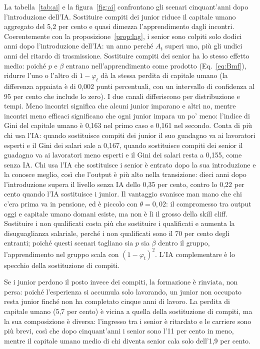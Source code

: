 \documentclass[preprint,12pt,authoryear]{elsarticle}
\begin{document}
La tabella~\ref{tab:ai} e la figura~\ref{fig:ai} confrontano gli scenari cinquant'anni dopo l'introduzione dell'IA. Sostituire compiti dei junior riduce il capitale umano aggregato del 5,2 per cento e quasi dimezza l'apprendimento dagli incontri. Coerentemente con la proposizione~\ref{prop:lag}, i senior sono colpiti solo dodici anni dopo l'introduzione dell'IA: un anno perché $A_t$ superi uno, più gli undici anni del ritardo di trasmissione. Sostituire compiti dei senior ha lo stesso effetto medio: poiché $p$ e $\beta$ entrano nell'apprendimento come prodotto (Eq.~\eqref{eq:Bmf}), ridurre l'uno o l'altro di $1-\varphi_t$ dà la stessa perdita di capitale umano (la differenza appaiata è di 0,002 punti percentuali, con un intervallo di confidenza al 95 per cento che include lo zero). I due canali differiscono per distribuzione e tempi. Meno incontri significa che alcuni junior imparano e altri no, mentre incontri meno efficaci significano che ogni junior impara un po' meno: l'indice di Gini del capitale umano è 0,163 nel primo caso e 0,161 nel secondo. Conta di più chi usa l'IA: quando sostituisce compiti dei junior il suo guadagno va ai lavoratori esperti e il Gini dei salari sale a 0,167, quando sostituisce compiti dei senior il guadagno va ai lavoratori meno esperti e il Gini dei salari resta a 0,155, come senza IA. Chi usa l'IA che sostituisce i senior è entrato dopo la sua introduzione e la conosce meglio, così che l'output è più alto nella transizione: dieci anni dopo l'introduzione supera il livello senza IA dello 0,35 per cento, contro lo 0,22 per cento quando l'IA sostituisce i junior. Il vantaggio svanisce man mano che chi c'era prima va in pensione, ed è piccolo con $\theta=0{,}02$: il compromesso tra output oggi e capitale umano domani esiste, ma non è lì il grosso della skill cliff. Sostituire i non qualificati costa più che sostituire i qualificati e aumenta la disuguaglianza salariale, perché i non qualificati sono il 70 per cento degli entranti; poiché questi scenari tagliano sia $p$ sia $\beta$ dentro il gruppo, l'apprendimento nel gruppo scala con $(1-\varphi_t)^2$. L'IA complementare è lo specchio della sostituzione di compiti.

Se i junior perdono il posto invece dei compiti, la formazione è rinviata, non persa: poiché l'esperienza si accumula solo lavorando, un junior non occupato resta junior finché non ha completato cinque anni di lavoro. La perdita di capitale umano (5,7 per cento) è vicina a quella della sostituzione di compiti, ma la sua composizione è diversa: l'ingresso tra i senior è ritardato e le carriere sono più brevi, così che dopo cinquant'anni i senior sono l'11 per cento in meno, mentre il capitale umano medio di chi diventa senior cala solo dell'1,9 per cento.
\end{document}
